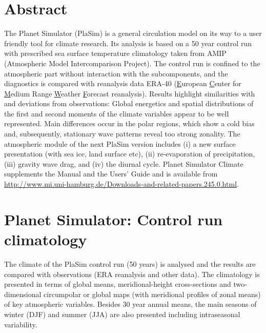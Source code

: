 \documentclass[12pt,a4paper,twoside,openright,headinclude,liststotoc,bibtotoc]{scrreprt}
\begin{document}
\chapter*{Abstract}
\vspace{-0.4cm}

The Planet Simulator (PlaSim) is a general circulation model on its way to a user friendly tool for climate research. Its analysis is based on a 50 year control run with prescribed sea surface temperature climatology taken from AMIP (Atmospheric Model Intercomparison Project). The control run is confined to the atmospheric part without interaction with the subcomponents, and the diagnostics is compared with reanalysis data ERA-40 (\underline{E}uropean \underline{C}enter for \underline{M}edium Range \underline{W}eather \underline{F}orecast reanalysis). Results highlight similarities with and deviations from observations: Global energetics and spatial distributions of the first and second moments of the climate variables appear to be well represented. Main differences occur in the polar regions, which show a cold bias and, subsequently, stationary wave patterns reveal too strong zonality. The atmospheric module of the next PlaSim version includes (i) a new surface presentation (with sea ice, land surface etc), (ii) re-evaporation of precipitation, (iii) gravity wave drag, and (iv) the diurnal cycle. Planet Simulator Climate supplements the Manual and the Users’ Guide and is available from \url{http://www.mi.uni-hamburg.de/Downloads-and-related-papers.245.0.html}.


\setlength{\headsep}{0.4cm}
\setlength{\topmargin}{-2cm}
  
\tableofcontents
\small\normalsize
\newpage

  
\vspace{-0.4cm}
\chapter{Planet Simulator: Control run climatology}
\vspace{-0.4cm}

The climate of the PlaSim control run (50 years) is analysed and the results are compared with observations (ERA reanalysis and other data). The climatology is presented in terms of global means, meridional-height cross-sections and two-dimensional circumpolar or global maps (with meridional profiles of zonal means) of key atmospheric variables. Besides 30 year annual means, the main seasons of winter (DJF) and summer (JJA) are also presented including intraseasonal variability. 
\end{document}
